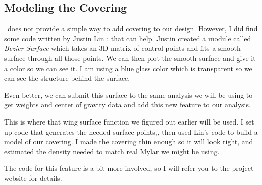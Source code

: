 \subsection{Modeling the Covering}

\osc\ does not provide a simple way to add covering to our design. However, I
did find some code written by Justin Lin :\cite{lin} that can help. Justin
created a module called {\it Bezier Surface} which takes an 3D matrix of control
points and fits a smooth surface through all those points. We can then plot the
smooth surface and give it a color so we can see it. I am using a blue glass
color which is transparent so we can see the structure behind the surface.

Even better, we can submit this surface to the same analysis we will be using to
get weights and center of gravity data and add this new feature to our
analysis.

This is where that wing surface function we figured out earlier  will be used.
I set up code that generates the needed surface points,, then used Lin's code to
build a model of our covering. I made the covering thin enough so it will look
right, and estimated the density needed to match real Mylar we might be using.

The code for this feature is a bit more involved, so I will refer you to the
project website for details.



